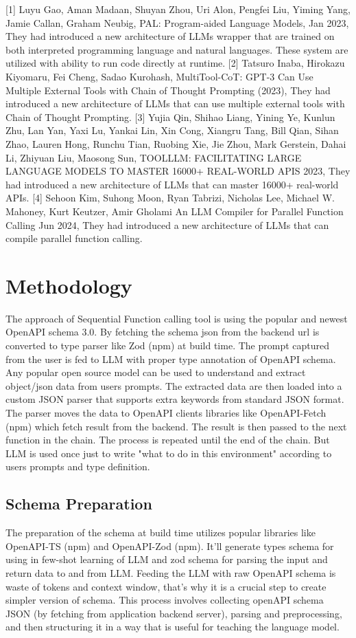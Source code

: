 \documentclass[conference]{IEEEtran}
\begin{document}
[1] Luyu Gao, Aman Madaan, Shuyan Zhou, Uri Alon, Pengfei Liu, Yiming
Yang, Jamie Callan, Graham Neubig, PAL: Program-aided
Language Models, Jan 2023, They had introduced a new architecture of LLMs wrapper that are trained on both interpreted programming language and natural languages. These system are utilized with ability to run code directly at runtime. [2] Tatsuro Inaba, Hirokazu Kiyomaru, Fei Cheng, Sadao Kurohash,
MultiTool-CoT: GPT-3 Can Use Multiple External Tools with Chain
of Thought Prompting (2023), They had introduced a new architecture of LLMs that can use multiple external tools with Chain of Thought Prompting. [3] Yujia Qin, Shihao Liang, Yining Ye, Kunlun Zhu, Lan Yan, Yaxi Lu,
Yankai Lin, Xin Cong, Xiangru Tang, Bill Qian, Sihan Zhao, Lauren
Hong, Runchu Tian, Ruobing Xie, Jie Zhou, Mark Gerstein, Dahai Li, Zhiyuan Liu, Maosong Sun, TOOLLLM: FACILITATING LARGE
LANGUAGE MODELS TO MASTER 16000+ REAL-WORLD APIS 2023, They had introduced a new architecture of LLMs that can master 16000+ real-world APIs. [4] Sehoon Kim, Suhong Moon, Ryan Tabrizi, Nicholas Lee, Michael W.
Mahoney, Kurt Keutzer, Amir Gholami An LLM Compiler
for Parallel Function Calling Jun 2024, They had introduced a new architecture of LLMs that can compile parallel function calling. 


\section{Methodology}
The approach of Sequential Function calling tool is using the popular and newest OpenAPI schema 3.0. By fetching the schema json from the backend url is converted to type parser like Zod (npm) at build time. The prompt captured from the user is fed to LLM with proper type annotation of OpenAPI schema. Any popular open source model can be used to understand and extract object/json data from users prompts. The extracted data are then loaded into a custom JSON parser that supports extra keywords from standard JSON format. The parser moves the data to OpenAPI clients libraries like OpenAPI-Fetch (npm) which fetch result from the backend. The result is then passed to the next function in the chain. The process is repeated until the end of the chain. But LLM is used once just to write "what to do in this environment" according to users prompts and type definition.

\subsection{Schema Preparation}\label{AA}
The preparation of the schema at build time utilizes popular libraries like OpenAPI-TS (npm) and OpenAPI-Zod (npm). It'll generate types schema for using in few-shot learning of LLM and zod schema for parsing the input and return data to and from LLM. Feeding the LLM with raw OpenAPI schema is waste of tokens and context window, that's why it is a crucial step to create simpler version of schema. This process involves collecting openAPI schema JSON (by fetching from application backend server), parsing and preprocessing, and then structuring it in a way that is useful for teaching the language model. 
\end{document}
